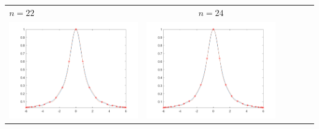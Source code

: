 \begin{tabular}{l*{5}{c}}
\hspace{3.5cm}\(n=22\) &  \(n=24\) \\
\includegraphics[scale=0.5]{cap4/4_7/22.png} &  \includegraphics[scale=0.5]{cap4/4_7/24.png} \\


\end{tabular}
